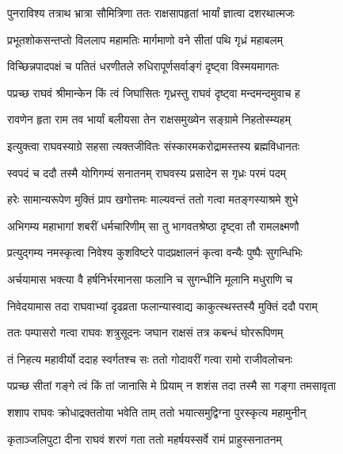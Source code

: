 \twolineshloka
{पुनराविश्य तत्राथ भ्रात्रा सौमित्रिणा ततः}
{राक्षसापहृतां भार्यां ज्ञात्वा दशरथात्मजः}%

\twolineshloka
{प्रभूतशोकसन्तप्तो विललाप महामतिः}
{मार्गमाणो वने सीतां पथि गृध्रं महाबलम्}%

\twolineshloka
{विच्छिन्नपादपक्षं च पतितं धरणीतले}
{रुधिरापूर्णसर्वाङ्गं दृष्ट्वा विस्मयमागतः}%

\twolineshloka
{पप्रच्छ राघवं श्रीमान्केन किं त्वं जिघांसितः}
{गृध्रस्तु राघवं दृष्ट्वा मन्दमन्दमुवाच ह}%


\twolineshloka
{रावणेन हृता राम तव भार्यां बलीयसा}
{तेन राक्षसमुख्येन सङ्ग्रामे निहतोस्म्यहम्}%


\twolineshloka
{इत्युक्त्वा राघवस्याग्रे सहसा त्यक्तजीवितः}
{संस्कारमकरोद्रामस्तस्य ब्रह्मविधानतः}%

\twolineshloka
{स्वपदं च ददौ तस्मै योगिगम्यं सनातनम्}
{राघवस्य प्रसादेन स गृध्रः परमं पदम्}%

\twolineshloka
{हरेः सामान्यरूपेण मुक्तिं प्राप खगोत्तमः}
{माल्यवन्तं ततो गत्वा मतङ्गस्याश्रमे शुभे}%

\twolineshloka
{अभिगम्य महाभागां शबरीं धर्मचारिणीम्}
{सा तु भागवतश्रेष्ठा दृष्ट्वा तौ रामलक्ष्मणौ}%

\twolineshloka
{प्रत्युद्गम्य नमस्कृत्वा निवेश्य कुशविष्टरे}
{पादप्रक्षालनं कृत्वा वन्यैः पुष्पैः सुगन्धिभिः}%

\twolineshloka
{अर्चयामास भक्त्या वै हर्षनिर्भरमानसा}
{फलानि च सुगन्धीनि मूलानि मधुराणि च}%

\twolineshloka
{निवेदयामास तदा राघवाभ्यां दृढव्रता}
{फलान्यास्वाद्य काकुत्स्थस्तस्यै मुक्तिं ददौ पराम्}%

\twolineshloka
{ततः पम्पासरो गत्वा राघवः शत्रुसूदनः}
{जघान राक्षसं तत्र कबन्धं घोररूपिणम्}%

\twolineshloka
{तं निहत्य महावीर्यो ददाह स्वर्गतश्च सः}
{ततो गोदावरीं गत्वा रामो राजीवलोचनः}%

\twolineshloka
{पप्रच्छ सीतां गङ्गे त्वं किं तां जानासि मे प्रियाम्}
{न शशंस तदा तस्मै सा गङ्गा तमसावृता}%

\twolineshloka
{शशाप राघवः क्रोधाद्रक्ततोया भवेति ताम्}
{ततो भयात्समुद्विग्ना पुरस्कृत्य महामुनीन्}%

\twolineshloka
{कृताञ्जलिपुटा दीना राघवं शरणं गता}
{ततो महर्षयस्सर्वे रामं प्राहुस्सनातनम्}%


